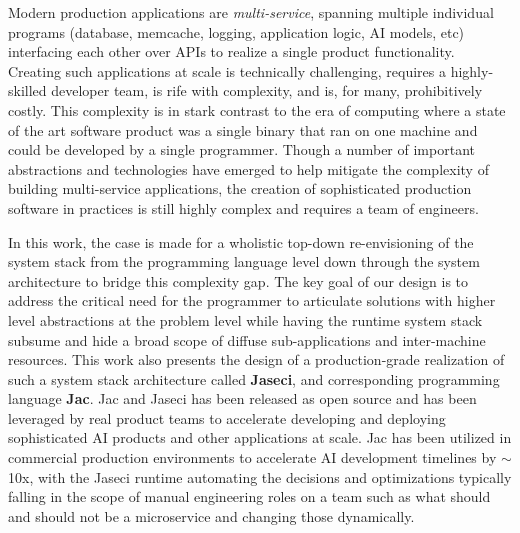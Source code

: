 Modern production applications are \emph{multi-service}, spanning multiple individual programs (database, memcache, logging, application logic, AI models, etc) interfacing each other over APIs to realize a single product functionality.
Creating such applications at scale is technically challenging, requires a highly-skilled developer team, is rife with complexity, and is, for many, prohibitively costly.
This complexity is in stark contrast to the era of computing where a state of the art software product was a single binary that ran on one machine and could be developed by a single programmer.
Though a number of important abstractions and technologies have emerged to help mitigate the complexity of building multi-service applications, the creation of sophisticated production software in practices is still highly complex and requires a team of engineers.


In this work, the case is made for a wholistic top-down re-envisioning of the system stack from the programming language level down through the system architecture to bridge this complexity gap.
The key goal of our design is to address the critical need for the programmer to articulate solutions with higher level abstractions at the problem level while having the runtime system stack subsume and hide a broad scope of diffuse sub-applications and inter-machine resources.
This work also presents the design of a production-grade realization of such a system stack architecture called \textbf{Jaseci}, and corresponding programming language \textbf{Jac}.
Jac and Jaseci has been released as open source and has been leveraged by real product teams to accelerate developing and deploying sophisticated AI products and other applications at scale.
Jac has been utilized in commercial production environments to accelerate AI development timelines by  $\sim$10x, with the Jaseci runtime automating the decisions and optimizations typically falling in the scope of manual engineering roles on a team such as what should and should not be a microservice and changing those dynamically.